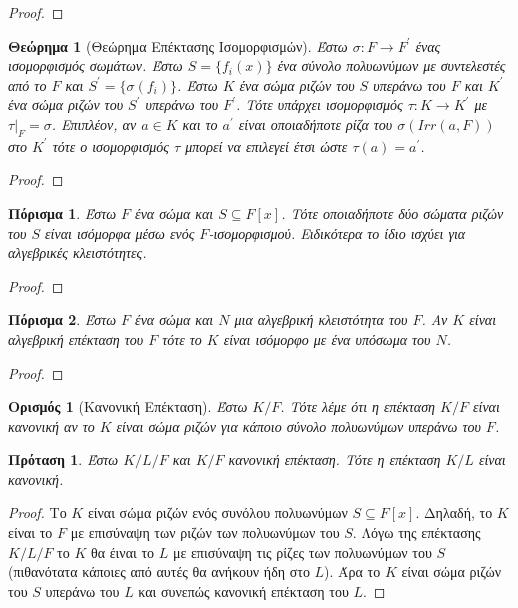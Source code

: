 \documentclass[oneside,a4paper]{article}
\newtheorem{theorem}{Θεώρημα}
\newtheorem*{defn}{Ορισμός}
\newtheorem{prop}{Πρόταση}
\newtheorem{cor}{Πόρισμα}
\begin{document}
\begin{proof}
\end{proof}


\begin{theorem} [Θεώρημα Επέκτασης Ισομορφισμών]
	Έστω $\sigma : F \rightarrow F^{\prime}$ ένας ισομορφισμός σωμάτων. Έστω $S = \{f_i (x)\}$ ένα σύνολο πολυωνύμων με συντελεστές από το $F$ και $S^{\prime} = \{\sigma (f_i)\}$. Έστω $K$ ένα σώμα ριζών του $S$ υπεράνω του $F$ και $K^{\prime}$ ένα σώμα ριζών του $S^{\prime}$ υπεράνω του $F^{\prime}$. Τότε υπάρχει ισομορφισμός $\tau : K \rightarrow K^{\prime}$ με $\tau|_F = \sigma$. Επιπλέον, αν $a \in K$ και το $a^{\prime}$ είναι οποιαδήποτε ρίζα του $\sigma(Irr(a,F))$ στο $K^{\prime}$ τότε ο ισομορφισμός $\tau$ μπορεί να επιλεγεί έτσι ώστε $\tau(a) = a^{\prime}$.
\end{theorem}

\begin{proof}
\end{proof}

\begin{cor} Έστω $F$ ένα σώμα και $S\subseteq F[x]$. Τότε οποιαδήποτε δύο σώματα ριζών του $S$ είναι ισόμορφα μέσω ενός $F$-ισομορφισμού. Ειδικότερα το ίδιο ισχύει για αλγεβρικές κλειστότητες.
\end{cor}

\begin{proof}
\end{proof}

\begin{cor}Έστω $F$ ένα σώμα και $N$ μια αλγεβρική κλειστότητα του $F$. Αν $K$ είναι αλγεβρική επέκταση του $F$ τότε το $K$ είναι ισόμορφο με ένα υπόσωμα του $N$.
\end{cor}


\begin{proof}
\end{proof}


\begin{defn}[Κανονική Επέκταση] Έστω $K/F$. Τότε λέμε ότι η επέκταση $K/F$ είναι κανονική αν το $K$ είναι σώμα ριζών για κάποιο σύνολο πολυωνύμων υπεράνω του $F$.
\end{defn}

\begin{prop}
	\label{exa3.25}
	Έστω $K/L/F$ και $K/F$ κανονική επέκταση. Τότε η επέκταση $K/L$ είναι κανονική.
\end{prop}
\begin{proof}
	Το $K$ είναι σώμα ριζών ενός συνόλου πολυωνύμων $S \subseteq F[x]$. Δηλαδή, το $K$ είναι το $F$ με επισύναψη των ριζών των πολυωνύμων του $S$. Λόγω της επέκτασης $K/L/F$ το $K$ θα έιναι το $L$ με επισύναψη τις ρίζες των πολυωνύμων του $S$ (πιθανότατα κάποιες από αυτές θα ανήκουν ήδη στο $L$). Άρα το $K$ είναι σώμα ριζών του $S$ υπεράνω του $L$ και συνεπώς κανονική επέκταση του $L$.
\end{proof}
\end{document}

